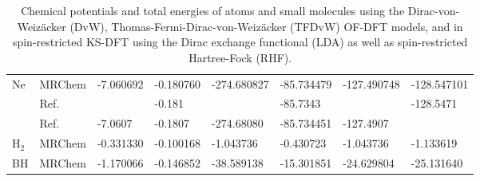 \begin{table}
\begin{center}
\begin{tabular}{ll|ll|llll}
Ne  & MRChem			&  -7.060692    &  -0.180760    & -274.680827   & -85.734479    & -127.490748   & -128.547101   \\
    & Ref.\cite{Chan:2000}	&	        &  -0.181       &	        & -85.7343      &		& -128.5471     \\
    & Ref.\cite{Karasiev:2012}  &  -7.0607	&  -0.1807      & -274.68080    & -85.734451    & -127.4907	&	        \\
\hline                                                      
H$_2$	& MRChem		&  -0.331330    &  -0.100168    &   -1.043736   &  -0.430723    &   -1.043736   &   -1.133619   \\
BH	& MRChem		&  -1.170066    &  -0.146852    &  -38.589138   & -15.301851    &  -24.629804   &  -25.131640   \\
\hline                                                                                  
\hline                                                                                  
\end{tabular}                                                                           
\caption{Chemical potentials and total energies of atoms and small molecules using the Dirac-von-Weiz\"{a}cker (DvW),
    Thomas-Fermi-Dirac-von-Weiz\"{a}cker (TFDvW) OF-DFT models, and in spin-restricted KS-DFT using the Dirac exchange
    functional (LDA) as well as spin-restricted Hartree-Fock (RHF).}
\label{tab:of-results}
\end{center}
\end{table}

